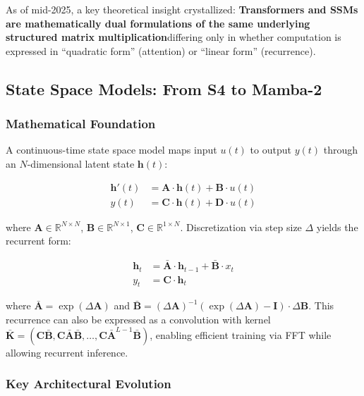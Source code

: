 \documentclass[11pt,a4paper]{article}
\begin{document}
As of mid-2025, a key theoretical insight crystallized: \textbf{Transformers and SSMs are mathematically dual formulations of the same underlying structured matrix multiplication}\textemdash differing only in whether computation is expressed in ``quadratic form'' (attention) or ``linear form'' (recurrence).

\subsection{State Space Models: From S4 to Mamba-2}

\subsubsection{Mathematical Foundation}

A continuous-time state space model maps input $u(t)$ to output $y(t)$ through an $N$-dimensional latent state $\mathbf{h}(t)$:

\begin{align}
\mathbf{h}'(t) &= \mathbf{A} \cdot \mathbf{h}(t) + \mathbf{B} \cdot u(t) \\
y(t) &= \mathbf{C} \cdot \mathbf{h}(t) + \mathbf{D} \cdot u(t)
\end{align}

where $\mathbf{A} \in \mathbb{R}^{N \times N}$, $\mathbf{B} \in \mathbb{R}^{N \times 1}$, $\mathbf{C} \in \mathbb{R}^{1 \times N}$. Discretization via step size $\Delta$ yields the recurrent form:

\begin{align}
\mathbf{h}_t &= \bar{\mathbf{A}} \cdot \mathbf{h}_{t-1} + \bar{\mathbf{B}} \cdot x_t \\
y_t &= \mathbf{C} \cdot \mathbf{h}_t
\end{align}

where $\bar{\mathbf{A}} = \exp(\Delta\mathbf{A})$ and $\bar{\mathbf{B}} = (\Delta\mathbf{A})^{-1}(\exp(\Delta\mathbf{A}) - \mathbf{I}) \cdot \Delta\mathbf{B}$. This recurrence can also be expressed as a convolution with kernel $\bar{\mathbf{K}} = (\mathbf{C}\bar{\mathbf{B}}, \mathbf{C}\bar{\mathbf{A}}\bar{\mathbf{B}}, \ldots, \mathbf{C}\bar{\mathbf{A}}^{L-1}\bar{\mathbf{B}})$, enabling efficient training via FFT while allowing recurrent inference.

\subsubsection{Key Architectural Evolution}
\end{document}
